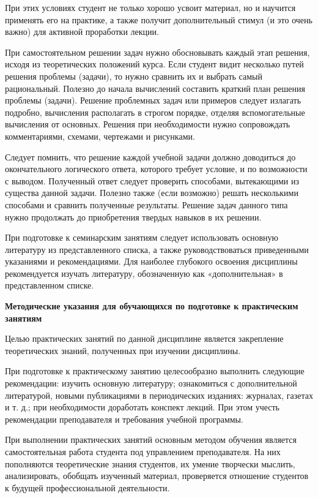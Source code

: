 \documentclass[a4paper, 12pt]{article}
\begin{document}
При этих условиях студент не только хорошо усвоит материал, но и научится применять его на практике, а также получит дополнительный стимул (и это очень важно) для активной проработки лекции.

При самостоятельном решении задач нужно обосновывать каждый этап решения, исходя из теоретических положений курса. Если студент видит несколько путей решения проблемы (задачи), то нужно сравнить их и выбрать самый рациональный. Полезно до начала вычислений составить краткий план решения проблемы (задачи). Решение проблемных задач или примеров следует излагать подробно, вычисления располагать в строгом порядке, отделяя вспомогательные вычисления от основных. Решения при необходимости нужно сопровождать комментариями, схемами, чертежами и рисунками. 

Следует помнить, что решение каждой учебной задачи должно доводиться до  окончательного логического ответа, которого требует условие, и по возможности с выводом. Полученный ответ следует проверить способами, вытекающими из существа данной задачи. Полезно также (если возможно) решать несколькими способами и сравнить полученные результаты. Решение задач данного типа нужно продолжать до приобретения твердых навыков в их решении. 

При подготовке к семинарским занятиям следует использовать основную литературу из представленного списка, а также руководствоваться приведенными указаниями и рекомендациями. Для наиболее глубокого освоения дисциплины рекомендуется изучать литературу, обозначенную как «дополнительная» в представленном списке.

\vspace{8pt}
{\bf Методические указания для обучающихся по подготовке к практическим занятиям}

Целью практических занятий по данной дисциплине является закрепление теоретических знаний, полученных при изучении дисциплины. 

При подготовке к практическому занятию целесообразно выполнить следующие рекомендации: изучить основную литературу; ознакомиться с дополнительной литературой, новыми публикациями в периодических изданиях: журналах, газетах и т. д.; при необходимости доработать конспект лекций. При этом учесть рекомендации преподавателя и требования учебной программы.

При выполнении практических занятий основным методом обучения является самостоятельная работа студента под управлением преподавателя. На них пополняются теоретические знания студентов, их умение творчески мыслить, анализировать, обобщать изученный материал, проверяется отношение студентов к будущей профессиональной деятельности.
\end{document}
